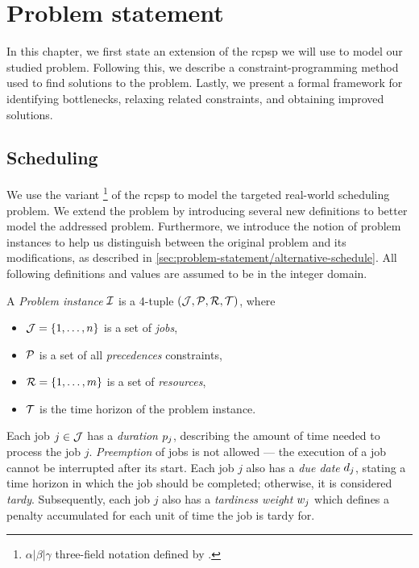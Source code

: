 \chapter{Problem statement} \label{chap:problem-statement}

In this chapter, we first state an extension of the \ac{rcpsp} we will use to model our studied problem.
Following this, we describe a constraint-programming method used to find solutions to the problem.
Lastly, we present a formal framework for identifying bottlenecks, relaxing related constraints,
and obtaining improved solutions.

\section{Scheduling} \label{sec:problem-statement/scheduling}


We use the \Problem{} variant%
\footnote{$\alpha | \beta | \gamma$ three-field notation defined by \citet{Brucker1999}.}
of the \ac{rcpsp} to model the targeted real-world scheduling problem.
We extend the problem by introducing several new definitions to better model the addressed problem.
Furthermore, we introduce the notion of problem instances to help us distinguish between the original problem
and its modifications, as described in \cref{sec:problem-statement/alternative-schedule}.
All following definitions and values are assumed to be in the integer domain.

\begin{defn} \label{def:problem-instance}
A \emph{Problem instance} $\mathcal{I}$ is a 4-tuple $(\mathcal{J}, \mathcal{P}, \mathcal{R}, \mathcal{T})$,
where
\begin{itemize}
    \item $\mathcal{J} = \{1, \dots, n\}$ is a set of \emph{jobs},
    \item $\mathcal{P}$ is a set of all \emph{precedences} constraints,
    \item $\mathcal{R} = \{1, \dots, m\}$ is a set of \emph{resources},
    \item $\mathcal{T}$ is the time horizon of the problem instance.
\end{itemize}
\end{defn}

Each job $j \in \mathcal{J}$ has a \emph{duration} $p_{j}$,
describing the amount of time needed to process the job $j$.
\emph{Preemption} of jobs is not allowed
--- the execution of a job cannot be interrupted after its start.
Each job $j$ also has a \emph{due date} $d_{j}$,
stating a time horizon in which the job should be completed;
otherwise, it is considered \emph{tardy}.
Subsequently, each job $j$ also has a \emph{tardiness weight} $w_{j}$
which defines a penalty accumulated for each unit of time the job is tardy for.

